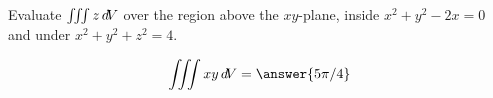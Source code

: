 \documentclass{ximera}
\author{David Guichard \and Neal Koblitz \and H. Jerome Keisler \and Albert Scheller \and Barry Balof \and Mike Wills \and Matthew Carr}
\begin{document}
\begin{exercise}




Evaluate $\iiint z \mathop{}\!d\! V$ over the region above the $xy$-plane, inside $x^2+y^2-2x=0$ and under $x^2+y^2+z^2=4$.

\begin{prompt}
\[
\iiint xy \d V=\answer{5\pi/4}
\]
\end{prompt}



\end{exercise}
\end{document}
